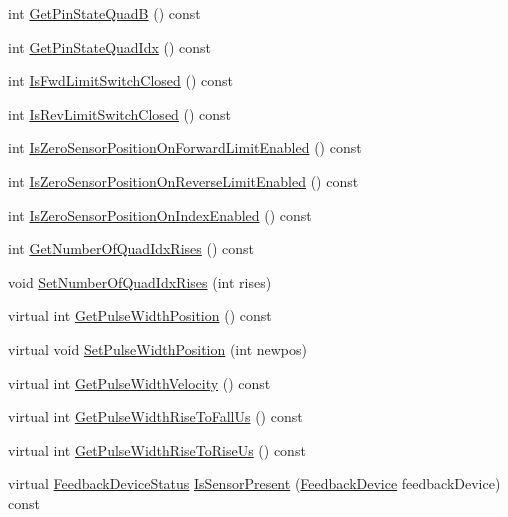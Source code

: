 \begin{DoxyCompactItemize}
\item 
int \hyperlink{class_c_a_n_talon_a27ae4c2fc57e43d717fb0a38119b3106}{Get\+Pin\+State\+QuadB} () const
\item 
int \hyperlink{class_c_a_n_talon_ae532dd6728f896c9366e373853886760}{Get\+Pin\+State\+Quad\+Idx} () const
\item 
int \hyperlink{class_c_a_n_talon_a892bcfbb4a6dacf4c4597703dffaf976}{Is\+Fwd\+Limit\+Switch\+Closed} () const
\item 
int \hyperlink{class_c_a_n_talon_a2c77ae2f1cfa966edbcd7c2bc30d36fc}{Is\+Rev\+Limit\+Switch\+Closed} () const
\item 
int \hyperlink{class_c_a_n_talon_ab612b5009dc905b6a5df4968cbbcfbb9}{Is\+Zero\+Sensor\+Position\+On\+Forward\+Limit\+Enabled} () const
\item 
int \hyperlink{class_c_a_n_talon_ab6d2a2143d143984be5ad72e6bf49e00}{Is\+Zero\+Sensor\+Position\+On\+Reverse\+Limit\+Enabled} () const
\item 
int \hyperlink{class_c_a_n_talon_a6408b0db20903b98d7e27082fc5df59e}{Is\+Zero\+Sensor\+Position\+On\+Index\+Enabled} () const
\item 
int \hyperlink{class_c_a_n_talon_a5f1fab77ecc45fc719a2a0886e0b3a4e}{Get\+Number\+Of\+Quad\+Idx\+Rises} () const
\item 
void \hyperlink{class_c_a_n_talon_a3d886b434c2e8c99415bd798f9ec1dc4}{Set\+Number\+Of\+Quad\+Idx\+Rises} (int rises)
\item 
virtual int \hyperlink{class_c_a_n_talon_adf3c68d62c6b246540518de56d7f1d21}{Get\+Pulse\+Width\+Position} () const
\item 
virtual void \hyperlink{class_c_a_n_talon_afab6a73cc6c8c22ac503b247f9cea0f2}{Set\+Pulse\+Width\+Position} (int newpos)
\item 
virtual int \hyperlink{class_c_a_n_talon_ac7566c2bae26a00cf161aeb257cc34e9}{Get\+Pulse\+Width\+Velocity} () const
\item 
virtual int \hyperlink{class_c_a_n_talon_a101348a9f09af22d54806c49e9346979}{Get\+Pulse\+Width\+Rise\+To\+Fall\+Us} () const
\item 
virtual int \hyperlink{class_c_a_n_talon_a8a007d31edef41225ddc4d7106d5cf42}{Get\+Pulse\+Width\+Rise\+To\+Rise\+Us} () const
\item 
virtual \hyperlink{class_c_a_n_talon_a9df2b5d336c09be76604dcb39da32172}{Feedback\+Device\+Status} \hyperlink{class_c_a_n_talon_a2fcdeff79b199573b81b9bc68b98443d}{Is\+Sensor\+Present} (\hyperlink{class_c_a_n_talon_a4a8af675a7712f305d17be2b825005e3}{Feedback\+Device} feedback\+Device) const

\end{DoxyCompactItemize}
